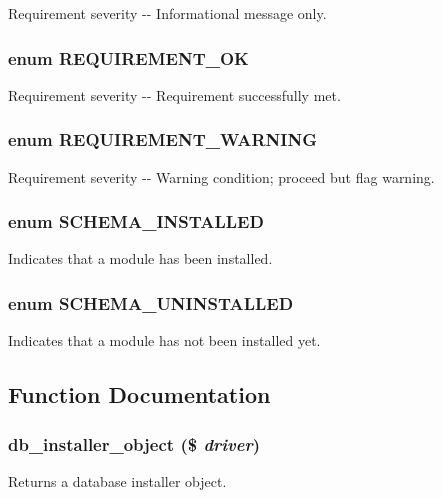 \label{install_8inc_ab679de0810b6a879525b822fa33e3d75}
Requirement severity -\/-\/ Informational message only. \hypertarget{install_8inc_add48d60abb0dc390c50bf824f1751cc2}{
\subsubsection[{REQUIREMENT\_\-OK}]{\setlength{\rightskip}{0pt plus 5cm}enum {\bf REQUIREMENT\_\-OK}}}
\label{install_8inc_add48d60abb0dc390c50bf824f1751cc2}
Requirement severity -\/-\/ Requirement successfully met. \hypertarget{install_8inc_a2879fcef075548b2dceeeaa9571dcf8d}{
\subsubsection[{REQUIREMENT\_\-WARNING}]{\setlength{\rightskip}{0pt plus 5cm}enum {\bf REQUIREMENT\_\-WARNING}}}
\label{install_8inc_a2879fcef075548b2dceeeaa9571dcf8d}
Requirement severity -\/-\/ Warning condition; proceed but flag warning. \hypertarget{install_8inc_aaa1b441be0b54ef62f6ea8d391f9cc99}{
\subsubsection[{SCHEMA\_\-INSTALLED}]{\setlength{\rightskip}{0pt plus 5cm}enum {\bf SCHEMA\_\-INSTALLED}}}
\label{install_8inc_aaa1b441be0b54ef62f6ea8d391f9cc99}
Indicates that a module has been installed. \hypertarget{install_8inc_ab2f11b038ed6a537bfdd257be863075f}{
\subsubsection[{SCHEMA\_\-UNINSTALLED}]{\setlength{\rightskip}{0pt plus 5cm}enum {\bf SCHEMA\_\-UNINSTALLED}}}
\label{install_8inc_ab2f11b038ed6a537bfdd257be863075f}
Indicates that a module has not been installed yet. 

\subsection{Function Documentation}
\hypertarget{install_8inc_aae9b6ee5100acd83eabbb2b2c2ab02c6}{
\subsubsection[{db\_\-installer\_\-object}]{\setlength{\rightskip}{0pt plus 5cm}db\_\-installer\_\-object (\$ {\em driver})}}
\label{install_8inc_aae9b6ee5100acd83eabbb2b2c2ab02c6}
Returns a database installer object.


